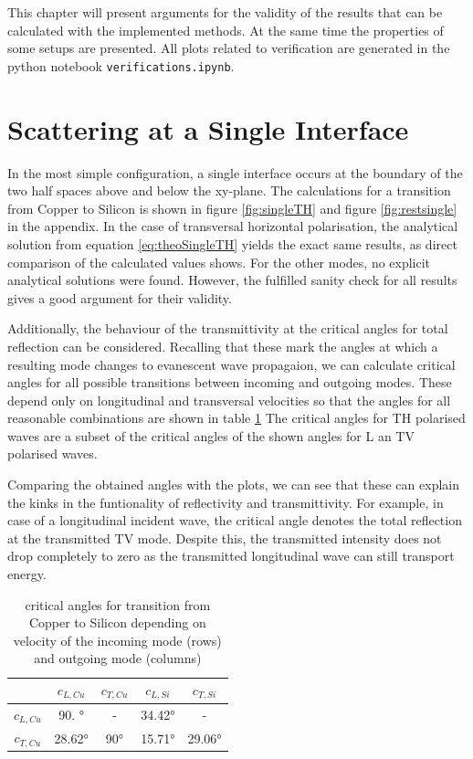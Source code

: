 This chapter will present arguments for the validity of the results that can be
calculated with the implemented methods. At the same time the properties of
some setups are presented. All plots related to verification are generated in
the
python notebook \texttt{verifications.ipynb}.

\section{Scattering at a Single Interface}
In the most simple configuration, a single interface occurs at the boundary of
the two half spaces above and below the xy-plane.
The calculations for a transition from Copper to Silicon is shown in figure
\ref{fig:singleTH} and figure \ref{fig:restsingle} in the appendix. In the case
of transversal horizontal polarisation, the analytical solution from equation
\ref{eq:theoSingleTH} yields the exact same results, as direct comparison of
the calculated values shows. For the other modes, no explicit analytical
solutions were found. However, the fulfilled sanity check for all results
gives a good argument for their validity.

Additionally, the behaviour of the transmittivity at the critical angles for
total reflection can be considered. Recalling that these mark the angles at
which a resulting mode changes to evanescent wave propagaion, we can calculate
critical angles for all possible transitions between incoming and outgoing
modes. These depend only on longitudinal and transversal velocities so that
the angles for all reasonable combinations are shown in table
\ref{tab:critangles}
The critical angles for TH polarised waves are a subset of the critical angles
of the shown angles for L an TV polarised waves.

Comparing the obtained angles with the plots, we can see that these can explain
the kinks in the funtionality of reflectivity and transmittivity. For example,
in case of a longitudinal incident wave, the critical angle denotes the total
reflection at the transmitted TV mode. Despite this, the transmitted intensity
does not drop completely to zero as the transmitted longitudinal wave can still
transport energy.
\begin{table}[p]
    \centering
    \begin{tabular}{c||c|c|c|c}
                   & $c_{L,Cu}$  & $c_{T,Cu}$ & $c_{L,Si}$  & $c_{T,Si}$
        \\ \hline
        $c_{L,Cu}$ & \ang{90. }  & -          & \ang{34.42} & -
        \\
        $c_{T,Cu}$ & \ang{28.62} & \ang{90}   & \ang{15.71} & \ang{29.06}
    \end{tabular}
    \caption{critical angles for transition from Copper to Silicon depending on
        velocity of the incoming mode (rows) and outgoing mode (columns)}
    \label{tab:critangles}
\end{table}

